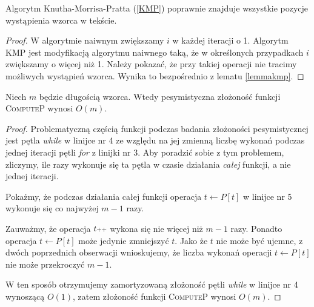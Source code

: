 \begin{theorem}
	Algorytm Knutha-Morrisa-Pratta (\ref{KMP}) poprawnie znajduje wszystkie pozycje wystąpienia wzorca w tekście. 
	\begin{proof}
		W algorytmie naiwnym zwiększamy $i$ w każdej iteracji o 1. Algorytm KMP jest modyfikacją algorytmu naiwnego taką, że w określonych przypadkach $i$ zwiększamy o więcej niż 1. Należy pokazać, że przy takiej operacji nie tracimy możliwych wystąpień wzorca. Wynika to bezpośrednio z lematu \ref{lemmakmp}.
	\end{proof}
\end{theorem}

\begin{lemma}
	\label{lemma:zlozonoscComputeP}
	Niech $m$ będzie długością wzorca. Wtedy pesymistyczna złożoność funkcji \textsc{ComputeP} wynosi $O(m)$.
	\begin{proof}
		Problematyczną częścią funkcji podczas badania złożoności pesymistycznej jest pętla \textit{while} w linijce nr 4 
		ze względu na jej zmienną %
		liczbę wykonań podczas jednej iteracji pętli \textit{for} z linijki nr 3. Aby poradzić sobie z tym problemem, zliczymy, ile razy wykonuje się ta pętla
		w czasie działania \textit{całej} funkcji, a nie jednej iteracji.
		 
		Pokażmy, że podczas działania całej funkcji operacja $t \gets P[t]$ w linijce nr 5 wykonuje się co najwyżej $m-1$ razy.
		
		Zauważmy, że operacja $t\pp$ wykona się nie więcej niż $m-1$ razy.
		Ponadto operacja $t \gets P[t]$ może jedynie zmniejszyć $t$. Jako że $t$ nie może
		być ujemne, z dwóch poprzednich obserwacji wnioskujemy, że
		liczba wykonań operacji $t \gets P[t]$ nie może przekroczyć $m-1$.
		
		W ten sposób otrzymujemy zamortyzowaną złożoność pętli \textit{while} w linijce nr 4
		wynoszącą $O(1)$, zatem złożoność funkcji \textsc{ComputeP} wynosi $O(m)$.
		
	\end{proof}	
\end{lemma}


